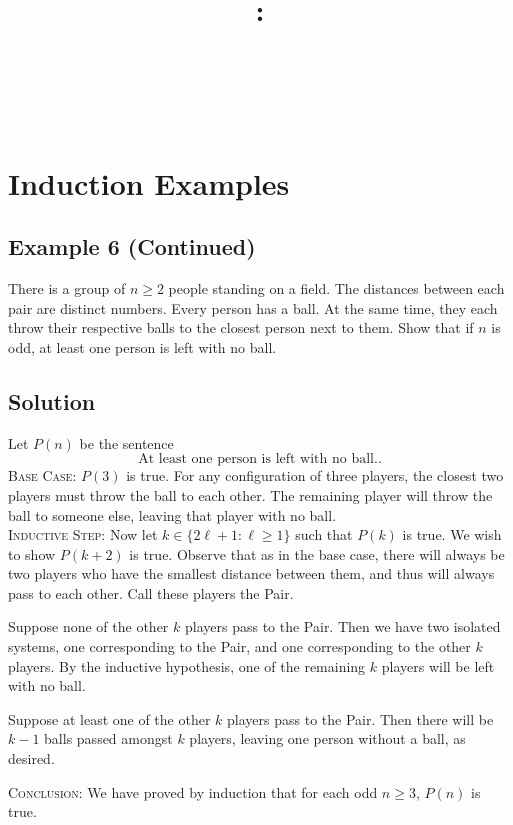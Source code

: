 \documentclass{article}
\title{
    \vspace{2in}
    \textbf{\lectClass:\\ \lectTitle}\\
    \vspace{0.1in}\large{\textit{\lectClassInstructor\ \lectSection}}
    \vspace{3in}
    \author{\textbf{\lectAuthorName}}
    \date{}
}
\begin{document}
\maketitle
\pagebreak

\section*{Induction Examples}

\subsection*{Example 6 (Continued)}
    There is a group of $n \ge 2$ people standing on a field. The distances between each pair are distinct numbers. Every person has a ball. At the same time, they each throw their respective balls to the closest person next to them. Show that if $n$ is odd, at least one person is left with no ball.

\subsection*{Solution}
    Let $P(n)$ be the sentence $$\text{At least one person is left with no ball.}.$$
    \textsc{Base Case}: $P(3)$ is true. For any configuration of three players, the closest two players must throw the ball to each other. The remaining player will throw the ball to someone else, leaving that player with no ball. \\
    \textsc{Inductive Step}: Now let $k \in \{2\ell + 1 : \ell \ge 1\}$ such that $P(k)$ is true. We wish to show $P(k + 2)$ is true. Observe that as in the base case, there will always be two players who have the smallest distance between them, and thus will always pass to each other. Call these players the Pair.
    \begin{Cases}
        \item Suppose none of the other $k$ players pass to the Pair. Then we have two isolated systems, one corresponding to the Pair, and one corresponding to the other $k$ players. By the inductive hypothesis, one of the remaining $k$ players will be left with no ball.
        \item Suppose at least one of the other $k$ players pass to the Pair. Then there will be $k - 1$ balls passed amongst $k$ players, leaving one person without a ball, as desired.
    \end{Cases}
    \textsc{Conclusion}: We have proved by induction that for each odd $n \ge 3$, $P(n)$ is true.
\end{document}
